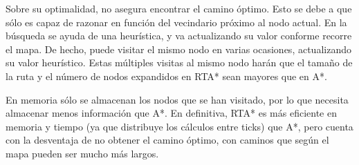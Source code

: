\documentclass[12pt]{article} %
\begin{document}
Sobre su optimalidad, no asegura encontrar el camino óptimo. Esto se debe a que sólo es capaz de razonar en función del vecindario próximo al nodo actual. En la búsqueda se ayuda de una heurística, y va actualizando su valor conforme recorre el mapa. De hecho, puede visitar el mismo nodo en varias ocasiones, actualizando su valor heurístico. Estas múltiples visitas al mismo nodo harán que el tamaño de la ruta y el número de nodos expandidos en RTA* sean mayores que en A*. 

En memoria sólo se almacenan los nodos que se han visitado, por lo que necesita almacenar menos información que A*. En definitiva, RTA* es más eficiente en memoria y tiempo (ya que distribuye los cálculos entre ticks) que A*, pero cuenta con la desventaja de no obtener el camino óptimo, con caminos que según el mapa pueden ser mucho más largos.
\end{document}
